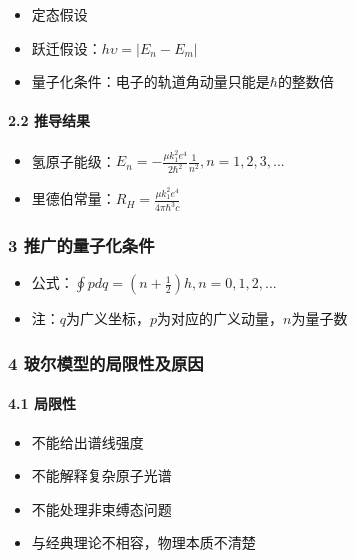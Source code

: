 \documentclass[UTF8,twocolumn]{ctexart}
\providecommand{\tightlist}{%
  \setlength{\itemsep}{0pt}\setlength{\parskip}{0pt}}
\let\oldparagraph\paragraph
\renewcommand{\paragraph}[1]{\oldparagraph{#1}\mbox{}}
\begin{document}
\begin{itemize}
\tightlist
\item
  定态假设
\item
  跃迁假设：\(h\upsilon=|E_n-E_m|\)
\item
  量子化条件：电子的轨道角动量只能是\(\hbar\)的整数倍
\end{itemize}

\hypertarget{ux63a8ux5bfcux7ed3ux679c}{%
\paragraph{{ }2.2 推导结果}\label{ux63a8ux5bfcux7ed3ux679c}}

\begin{itemize}
\item
  氢原子能级：\(E_n=-\frac{\mu k_1^2e^4}{2\hbar^2}\frac{1}{n^2},n=1,2,3,...\)
\item
  里德伯常量：\(R_H=\frac{\mu k_1^2e^4}{4\pi\hbar^3c}\)
\end{itemize}

\hypertarget{ux63a8ux5e7fux7684ux91cfux5b50ux5316ux6761ux4ef6}{%
\subsubsection{3
推广的量子化条件}\label{ux63a8ux5e7fux7684ux91cfux5b50ux5316ux6761ux4ef6}}

\begin{itemize}
\tightlist
\item
  公式：\(\oint pdq=(n+\frac{1}{2})h,n=0,1,2,...\)
\item
  注：\(q\)为广义坐标，\(p\)为对应的广义动量，\(n\)为量子数
\end{itemize}

\hypertarget{ux73bbux5c14ux6a21ux578bux7684ux5c40ux9650ux6027ux53caux539fux56e0}{%
\subsubsection{4
玻尔模型的局限性及原因}\label{ux73bbux5c14ux6a21ux578bux7684ux5c40ux9650ux6027ux53caux539fux56e0}}

\hypertarget{ux5c40ux9650ux6027}{%
\paragraph{{ }4.1 局限性}\label{ux5c40ux9650ux6027}}

\begin{itemize}
\tightlist
\item
  不能给出谱线强度
\item
  不能解释复杂原子光谱
\item
  不能处理非束缚态问题
\item
  与经典理论不相容，物理本质不清楚
\end{itemize}
\end{document}
